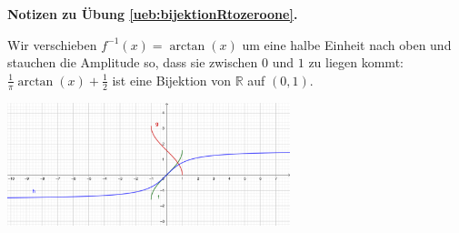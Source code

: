 \documentclass[%
11pt,%
twoside,%
titlepage,%
german,%
headsepline%
]{scrartcl}
\newcommand{\concatueb}[1]{ueb:#1}%
\newcommand{\concatlsg}[1]{lsg:#1}%
\newenvironment{lsg}[1]{%
    \par\noindent\textbf{Notizen zu Übung \ref{\concatueb{#1}}.}%
    \label{\concatlsg{#1}}
}{%
    \par%
}
\begin{document}
\begin{lsg}{bijektionRtozeroone}
Wir verschieben $f^{-1}(x)=\arctan(x)$ um eine halbe Einheit nach oben und stauchen die Amplitude so, dass sie zwischen $0$ und $1$ zu liegen kommt: $\frac{1}{\pi}\arctan(x)+\frac{1}{2}$ ist eine Bijektion von $\mathbb{R}$ auf $(0,1)$.

\begin{center}
\includegraphics[width=0.618\textwidth]{pictures/arctan.png}
\end{center}
\end{lsg}

\clearpage
\end{document}
